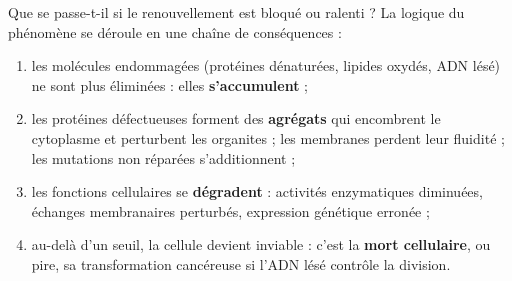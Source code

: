 \documentclass[11pt]{article}
\begin{document}
Que se passe-t-il si le renouvellement est bloqué ou ralenti ? La logique du phénomène se déroule en une chaîne de conséquences :

\begin{enumerate}
\item les molécules endommagées (protéines dénaturées, lipides oxydés, ADN lésé) ne sont plus éliminées : elles \textbf{s'accumulent} ;
\item les protéines défectueuses forment des \textbf{agrégats} qui encombrent le cytoplasme et perturbent les organites ; les membranes perdent leur fluidité ; les mutations non réparées s'additionnent ;
\item les fonctions cellulaires se \textbf{dégradent} : activités enzymatiques diminuées, échanges membranaires perturbés, expression génétique erronée ;
\item au-delà d'un seuil, la cellule devient inviable : c'est la \textbf{mort cellulaire}, ou pire, sa transformation cancéreuse si l'ADN lésé contrôle la division.
\end{enumerate}
\end{document}
